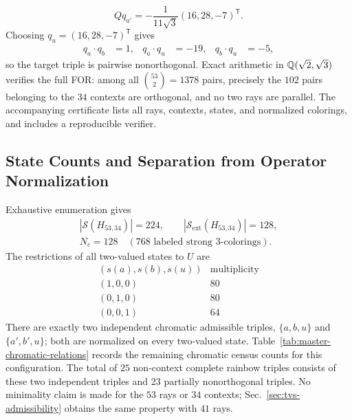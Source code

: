 \documentclass[aps,pra,reprint,superscriptaddress,longbibliography,nofootinbib,floatfix,10pt]{revtex4-2}
\theoremstyle{definition}\newtheorem{definition}[theorem]{Definition}
\theoremstyle{remark}\newtheorem{remark}[theorem]{Remark}
\newcommand{\Sc}{\mathcal S}\newcommand{\Cc}{\mathcal C}\newcommand{\Wc}{\mathcal W}
\begin{document}
\begin{equation}\label{eq:H53-u-ray}
Qq_{a'}=-\frac1{11\sqrt3}(16,28,-7)^{\mathsf T}.
\end{equation}
Choosing $q_u=(16,28,-7)^{\mathsf T}$ gives
\begin{equation}\label{eq:H53-target-products}
\begin{aligned}
q_a\cdot q_b&=1,&q_a\cdot q_u&=-19,&q_b\cdot q_u&=-5,
\end{aligned}
\end{equation}
so the target triple is pairwise nonorthogonal. Exact arithmetic in $\mathbb Q(\sqrt2,\sqrt3)$ verifies the full FOR: among all $\binom{53}{2}=1378$ pairs, precisely the $102$ pairs belonging to the $34$ contexts are orthogonal, and no two rays are parallel. The accompanying certificate lists all rays, contexts, states, and normalized colorings, and includes a reproducible verifier.

\subsection{State Counts and Separation from Operator Normalization}

Exhaustive enumeration gives
\begin{equation}\label{eq:H53-counts}
\begin{gathered}
|\Sc(H_{53,34})|=224,\qquad|\Sc_{\mathrm{ext}}(H_{53,34})|=128,\\
N_c=128\quad(768\text{ labeled strong }3\text{-colorings}).
\end{gathered}
\end{equation}
The restrictions of all two-valued states to $U$ are
\begin{equation}\label{eq:H53-patterns}
\begin{array}{c|r}
(s(a),s(b),s(u))&\text{multiplicity}\\\hline
(1,0,0)&80\\
(0,1,0)&80\\
(0,0,1)&64
\end{array}
\end{equation}
There are exactly two independent chromatic admissible triples, $\{a,b,u\}$ and $\{a',b',u\}$; both are normalized on every two-valued state. Table~\ref{tab:master-chromatic-relations} records the remaining chromatic census counts for this configuration. The total of $25$ non-context complete rainbow triples consists of these two independent triples and $23$ partially nonorthogonal triples. No minimality claim is made for the $53$ rays or $34$ contexts; Sec.~\ref{sec:tvs-admissibility} obtains the same property with $41$ rays.
\end{document}
